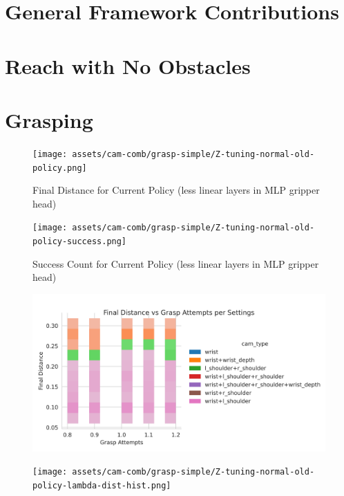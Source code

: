 \section{General Framework Contributions}


\section{Reach with No Obstacles}

\section{Grasping}

\begin{figure}[htpb] %
  \centering
  \texttt{[image: assets/cam-comb/grasp-simple/Z-tuning-normal-old-policy.png]}
  \caption{Final Distance for Current Policy (less linear layers in MLP gripper head)}\label{fig:Z}
\end{figure}

\begin{figure}[htpb] %
  \centering
  \texttt{[image: assets/cam-comb/grasp-simple/Z-tuning-normal-old-policy-success.png]}
  \caption{Success Count for Current Policy (less linear layers in MLP gripper head)}\label{fig:Z}
\end{figure}

\begin{figure}[htpb] %
  \centering
  \includegraphics[width=\linewidth]{assets/cam-comb/grasp-simple/Z-tuning-normal-old-policy-lambda-dist-hist-hue-cams.png}
  \caption{}\label{fig:Z-grasp-tuning-dist}
\end{figure}


\begin{figure}[htpb] %
  \centering
  \texttt{[image: assets/cam-comb/grasp-simple/Z-tuning-normal-old-policy-lambda-dist-hist.png]}
  \caption{}\label{fig:Z-grasp-tuning-dist}
\end{figure}

